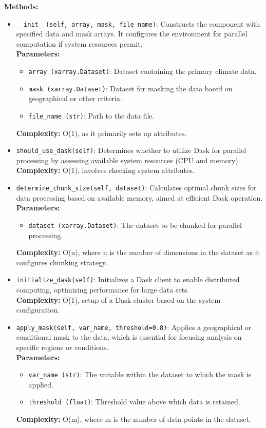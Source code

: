 \documentclass[a4paper,12pt]{article}
\begin{document}
\textbf{Methods:}
\begin{itemize}
    \item \texttt{\_\_init\_\_(self, array, mask, file\_name)}: Constructs the component with specified data and mask arrays. It configures the environment for parallel computation if system resources permit. \\
    \textbf{Parameters:}
    \begin{itemize}
        \item \texttt{array (xarray.Dataset)}: Dataset containing the primary climate data.
        \item \texttt{mask (xarray.Dataset)}: Dataset for masking the data based on geographical or other criteria.
        \item \texttt{file\_name (str)}: Path to the data file.
    \end{itemize}
    \textbf{Complexity:} O(1), as it primarily sets up attributes.
    
    \item \texttt{should\_use\_dask(self)}: Determines whether to utilize Dask for parallel processing by assessing available system resources (CPU and memory). \\
    \textbf{Complexity:} O(1), involves checking system attributes.
    
    \item \texttt{determine\_chunk\_size(self, dataset)}: Calculates optimal chunk sizes for data processing based on available memory, aimed at efficient Dask operation. \\
    \textbf{Parameters:}
    \begin{itemize}
        \item \texttt{dataset (xarray.Dataset)}: The dataset to be chunked for parallel processing.
    \end{itemize}
    \textbf{Complexity:} O(n), where n is the number of dimensions in the dataset as it configures chunking strategy.
    
    \item \texttt{initialize\_dask(self)}: Initializes a Dask client to enable distributed computing, optimizing performance for large data sets. \\
    \textbf{Complexity:} O(1), setup of a Dask cluster based on the system configuration.
    
    \item \texttt{apply\_mask(self, var\_name, threshold=0.8)}: Applies a geographical or conditional mask to the data, which is essential for focusing analysis on specific regions or conditions. \\
    \textbf{Parameters:}
    \begin{itemize}
        \item \texttt{var\_name (str)}: The variable within the dataset to which the mask is applied.
        \item \texttt{threshold (float)}: Threshold value above which data is retained.
    \end{itemize}
    \textbf{Complexity:} O(m), where m is the number of data points in the dataset.
    

\end{itemize}
\end{document}
